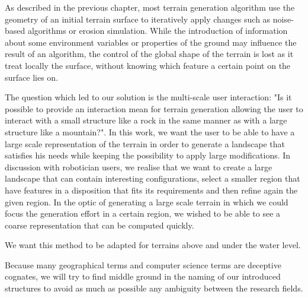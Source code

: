 As described in the previous chapter, most terrain generation algorithm use the geometry of an initial terrain surface to iteratively apply changes such as noise-based algorithms or erosion simulation. While the introduction of information about some environment variables or properties of the ground may influence the result of an algorithm, the control of the global shape of the terrain is lost as it treat locally the surface, without knowing which feature a certain point on the surface lies on.

The question which led to our solution is the multi-scale user interaction: "Is it possible to provide an interaction mean for terrain generation allowing the user to interact with a small structure like a rock in the same manner as with a large structure like a mountain?". 
In this work, we want the user to be able to have a large scale representation of the terrain in order to generate a landscape that satisfies his needs while keeping the possibility to apply large modifications.
In discussion with robotician users, we realise that we want to create a large landscape that can contain interesting configurations, select a smaller region that have features in a disposition that fits its requirements and then refine again the given region.
In the optic of generating a large scale terrain in which we could focus the generation effort in a certain region, we wished to be able to see a coarse representation that can be computed quickly.

We want this method to be adapted for terrains above and under the water level.

Because many geographical terms and computer science terms are deceptive cognates, we will try to find middle ground in the naming of our introduced structures to avoid as much as possible any ambiguity between the research fields.


